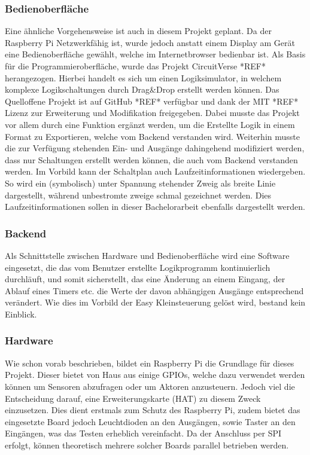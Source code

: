 \subsubsection{Bedienoberfläche} 
Eine ähnliche Vorgehensweise ist auch in diesem Projekt geplant. Da der Raspberry Pi Netzwerkfähig ist, wurde jedoch anstatt einem Display am Gerät eine Bedienoberfläche gewählt, welche im Internetbrowser bedienbar ist. Als Basis für die Programmieroberfläche, wurde das Projekt CircuitVerse *REF* herangezogen. Hierbei handelt es sich um einen Logiksimulator, in welchem komplexe Logikschaltungen durch Drag\&Drop erstellt werden können. Das Quelloffene Projekt ist auf GitHub *REF* verfügbar und dank  der MIT *REF* Lizenz zur Erweiterung und Modifikation freigegeben. Dabei musste das Projekt vor allem durch eine Funktion ergänzt werden, um die Erstellte Logik in einem Format zu Exportieren, welche vom Backend verstanden wird. Weiterhin musste die zur Verfügung stehenden Ein- und Ausgänge dahingehend modifiziert werden, dass nur Schaltungen erstellt werden können, die auch vom Backend verstanden werden. 
Im Vorbild kann der Schaltplan auch Laufzeitinformationen wiedergeben. So wird ein (symbolisch) unter Spannung stehender Zweig als breite Linie dargestellt, während unbestromte zweige schmal gezeichnet werden. Dies Laufzeitinformationen sollen in dieser Bachelorarbeit ebenfalls dargestellt werden.
\subsubsection{Backend} 
Als Schnittstelle zwischen Hardware und Bedienoberfläche wird eine Software eingesetzt, die das vom Benutzer erstellte Logikprogramm kontinuierlich durchläuft, und somit sicherstellt, das eine Änderung an einem Eingang, der Ablauf eines Timers etc. die Werte der davon abhängigen Ausgänge entsprechend verändert. Wie dies im Vorbild der Easy Kleinsteuerung gelöst wird, bestand kein Einblick.  

\subsubsection{Hardware} 
Wie schon vorab beschrieben, bildet ein Raspberry Pi die Grundlage für dieses Projekt. Dieser bietet von Haus aus einige GPIOs, welche  dazu  verwendet werden können um Sensoren abzufragen oder um Aktoren anzusteuern. Jedoch viel die Entscheidung darauf, eine Erweiterungskarte (HAT) zu diesem Zweck einzusetzen. Dies dient erstmals zum Schutz des Raspberry Pi, zudem bietet das eingesetzte Board jedoch Leuchtdioden an den Ausgängen, sowie Taster an den Eingängen, was das Testen erheblich vereinfacht. Da der Anschluss per SPI erfolgt, können theoretisch mehrere solcher Boards parallel betrieben werden. 

